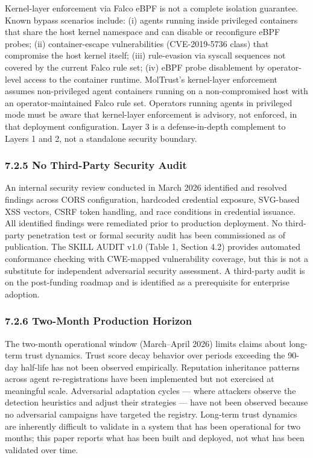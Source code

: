 Kernel-layer enforcement via Falco eBPF is not a complete isolation guarantee. Known bypass scenarios include: (i) agents running inside privileged containers that share the host kernel namespace and can disable or reconfigure eBPF probes; (ii) container-escape vulnerabilities (CVE-2019-5736 class) that compromise the host kernel itself; (iii) rule-evasion via syscall sequences not covered by the current Falco rule set; (iv) eBPF probe disablement by operator-level access to the container runtime. MolTrust's kernel-layer enforcement assumes non-privileged agent containers running on a non-compromised host with an operator-maintained Falco rule set. Operators running agents in privileged mode must be aware that kernel-layer enforcement is advisory, not enforced, in that deployment configuration. Layer 3 is a defense-in-depth complement to Layers 1 and 2, not a standalone security boundary.


\subsubsection{7.2.5 No Third-Party Security Audit}

An internal security review conducted in March 2026 identified and resolved findings across CORS configuration, hardcoded credential exposure, SVG-based XSS vectors, CSRF token handling, and race conditions in credential issuance. All identified findings were remediated prior to production deployment. No third-party penetration test or formal security audit has been commissioned as of publication. The SKILL AUDIT v1.0 (Table 1, Section 4.2) provides automated conformance checking with CWE-mapped vulnerability coverage, but this is not a substitute for independent adversarial security assessment. A third-party audit is on the post-funding roadmap and is identified as a prerequisite for enterprise adoption.


\subsubsection{7.2.6 Two-Month Production Horizon}

The two-month operational window (March–April 2026) limits claims about long-term trust dynamics. Trust score decay behavior over periods exceeding the 90-day half-life has not been observed empirically. Reputation inheritance patterns across agent re-registrations have been implemented but not exercised at meaningful scale. Adversarial adaptation cycles — where attackers observe the detection heuristics and adjust their strategies — have not been observed because no adversarial campaigns have targeted the registry. Long-term trust dynamics are inherently difficult to validate in a system that has been operational for two months; this paper reports what has been built and deployed, not what has been validated over time.


